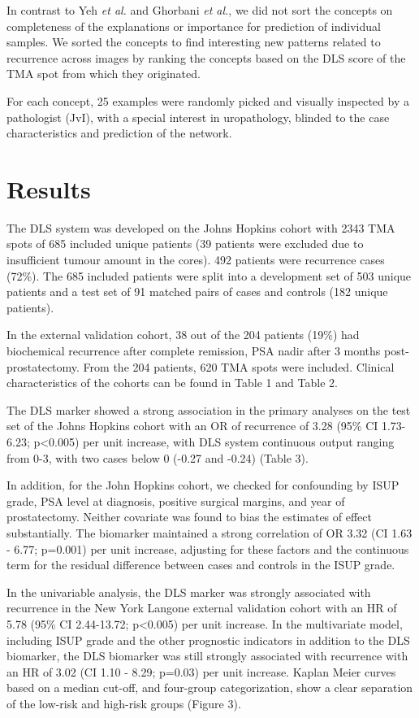 \documentclass[
  12pt,
  a5,margin=2cmpaper,
]{article}
\begin{document}
In contrast to Yeh \emph{et al.} and Ghorbani \emph{et al.}, we did not
sort the concepts on completeness of the explanations or importance for
prediction of individual samples. We sorted the concepts to find
interesting new patterns related to recurrence across images by ranking
the concepts based on the DLS score of the TMA spot from which they
originated.

For each concept, 25 examples were randomly picked and visually
inspected by a pathologist (JvI), with a special interest in
uropathology, blinded to the case characteristics and prediction of the
network.

\hypertarget{results}{%
\section{Results}\label{results}}

The DLS system was developed on the Johns Hopkins cohort with 2343 TMA
spots of 685 included unique patients (39 patients were excluded due to
insufficient tumour amount in the cores). 492 patients were recurrence
cases (72\%). The 685 included patients were split into a development
set of 503 unique patients and a test set of 91 matched pairs of cases
and controls (182 unique patients).

In the external validation cohort, 38 out of the 204 patients (19\%) had
biochemical recurrence after complete remission, PSA nadir after 3
months post-prostatectomy. From the 204 patients, 620 TMA spots were
included. Clinical characteristics of the cohorts can be found in Table
1 and Table 2.

The DLS marker showed a strong association in the primary analyses on
the test set of the Johns Hopkins cohort with an OR of recurrence of
3.28 (95\% CI 1.73-6.23; p\textless0.005) per unit increase, with DLS
system continuous output ranging from 0-3, with two cases below 0 (-0.27
and -0.24) (Table 3).

In addition, for the John Hopkins cohort, we checked for confounding by
ISUP grade, PSA level at diagnosis, positive surgical margins, and year
of prostatectomy. Neither covariate was found to bias the estimates of
effect substantially. The biomarker maintained a strong correlation of
OR 3.32 (CI 1.63 - 6.77; p=0.001) per unit increase, adjusting for these
factors and the continuous term for the residual difference between
cases and controls in the ISUP grade.

In the univariable analysis, the DLS marker was strongly associated with
recurrence in the New York Langone external validation cohort with an HR
of 5.78 (95\% CI 2.44-13.72; p\textless0.005) per unit increase. In the
multivariate model, including ISUP grade and the other prognostic
indicators in addition to the DLS biomarker, the DLS biomarker was still
strongly associated with recurrence with an HR of 3.02 (CI 1.10 - 8.29;
p=0.03) per unit increase. Kaplan Meier curves based on a median
cut-off, and four-group categorization, show a clear separation of the
low-risk and high-risk groups (Figure 3).
\end{document}
